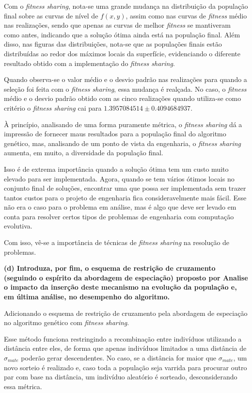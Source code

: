\documentclass[a4paper, 12pt]{article}
\newcommand{\fitness}{\textit{fitness}\xspace}
\newcommand{\fitsha}{\textit{fitness sharing}\xspace}
\begin{document}
Com o \fitsha, nota-se uma grande mudança na distribuição da população final sobre as curvas de nível de $f(x, y)$, assim como nas curvas de \fitness médio nas realizações, sendo que apenas as curvas de melhor \fitness se mantiveram como antes, indicando que a solução ótima ainda está na população final. Além disso, nas figuras das distribuições, nota-se que as populações finais estão distribuídas ao redor dos máximos locais da superfície, evidenciando o diferente resultado obtido com a implementação do \fitsha.

Quando observa-se o valor médio e o desvio padrão nas realizações para quando a seleção foi feita com o \fitsha, essa mudança é realçada. No caso, o \fitness médio e o desvio padrão obtido com as cinco realizações quando utiliza-se como critério o \fitsha cai para $1.3957084514\pm 0.4094684937$.

À princípio, analisando de uma forma puramente métrica, o \fitsha dá a impressão de fornecer maus resultados para a população final do algoritmo genético, mas, analisando de um ponto de vista da engenharia, o \fitsha aumenta, em muito, a diversidade da população final. 

Isso é de extrema importância quando a solução ótima tem um custo muito elevado para ser implementada. Agora, quando se tem vários ótimos locais no conjunto final de soluções, encontrar uma que possa ser implementada sem trazer tantos custos para o projeto de engenharia fica consideravelmente mais fácil. Esse não era o caso para o problema em análise, mas é algo que deve ser levado em conta para resolver certos tipos de problemas de engenharia com computação evolutiva. 

Com isso, vê-se a importância de técnicas de \fitsha na resolução de problemas.

\textbf{(d) Introduza, por fim, o esquema de restrição de cruzamento (seguindo o espírito da abordagem de especiação) proposto por \cite{deb1989genetic} Analise o impacto da inserção deste mecanismo na evolução da população e, em última análise, no desempenho do algoritmo.}

Adicionando o esquema de restrição de cruzamento pela abordagem de especiação no algoritmo genético com \fitsha. 

Esse método funciona restringindo a recombinação entre indivíduos utilizando a distância entre eles, de forma que apenas indivíduos limitados a uma distância de $\sigma_{mate}$ poderão gerar descendentes. No caso, se a distância for maior que $\sigma_{mate}$, um novo sorteio é realizado e, caso toda a população seja varrida para procurar outro par com base na distância, um indivíduo aleatório é sorteado, desconsiderando essa métrica.
\end{document}
